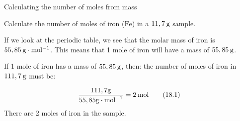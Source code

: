       \noindent 
      \begin{wex}{Calculating the number of moles from mass }{
      \label{m38717*probfhsst!!!underscore!!!id210}
      \label{m38717*id276776}Calculate the number of moles of iron ($\mathrm{Fe}$) in a $11,7\phantom{\rule{2pt}{0ex}}\mathrm{g}$ sample.\par 
      \vspace{5pt} }
{
      \label{m38717*id276821}If we look at the periodic table, we see that the molar mass of iron is $55,85\phantom{\rule{2pt}{0ex}}\mathrm{g}\ensuremath{\cdot}\mathrm{mol}{}^{-1}$. This means that 1 mole of iron will have a mass of $55,85\phantom{\rule{2pt}{0ex}}\mathrm{g}$.\par 
      \label{m38717*id276848}If 1 mole of iron has a mass of $55,85\phantom{\rule{2pt}{0ex}}\mathrm{g}$, then: the number of moles of iron in $111,7\phantom{\rule{2pt}{0ex}}\mathrm{g}$ must be:\par 
      \label{m38717*id276852}\nopagebreak\noindent{}
        
    \begin{equation}
    \frac{111,7\mathrm{g}}{55,85\mathrm{g}\ensuremath{\cdot}{\mathrm{mol}}^{-1}}=2\phantom{\rule{2pt}{0ex}}\mathrm{mol}\tag{18.1}
      \end{equation}
      \label{m38717*id276911}There are 2 moles of iron in the sample.\par 
}
    \end{wex}

